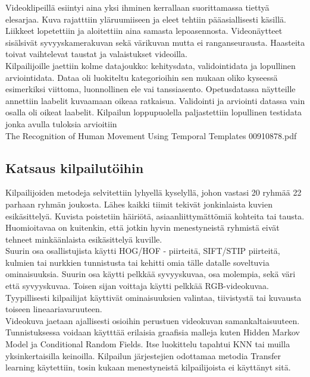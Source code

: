 Videoklipeillä esiintyi aina yksi ihminen kerrallaan suorittamassa tiettyä elesarjaa. Kuva rajatttiin yläruumiiseen ja eleet tehtiin
pääasiallisesti käsillä. Liikkeet lopetettiin ja aloitettiin aina samasta lepoasennosta. Videonäytteet sisälsivät syvyyskamerakuvan sekä värikuvan 
mutta ei ranganseurausta. Haasteita toivat vaihtelevat taustat ja valaistukset videoilla.\\

Kilpailijoille jaettiin kolme datajoukko: kehitysdata, validointidata ja lopullinen arviointidata. Dataa oli luokiteltu kategorioihin sen mukaan
oliko kyseessä esimerkiksi viittoma, luonnollinen ele vai tanssiasento. Opetusdatassa näytteille annettiin laabelit kuvaamaan oikeaa ratkaisua.
Validointi ja arviointi datassa vain osalla oli oikeat laabelit. Kilpailun loppupuolella paljastettiin lopullinen testidata jonka avulla tuloksia arvioitiin\\

The Recognition of Human Movement Using Temporal Templates
00910878.pdf


\subsection{Katsaus kilpailutöihin}
Kilpailijoiden metodeja selvitettiin lyhyellä kyselyllä, johon vastasi 20 ryhmää 22 parhaan ryhmän joukosta.
Lähes kaikki tiimit tekivät jonkinlaista kuvien esikäsittelyä. Kuvista poistetiin häiriötä, asiaanliittymättömiä kohteita tai tausta.
Huomioitavaa on kuitenkin, että jotkin hyvin menestyneistä ryhmistä eivät tehneet minkäänlaista esikäsittelyä kuville.\\

Suurin osa osallistujista käytti HOG/HOF - piirteitä, SIFT/STIP piirteitä, kulmien tai nurkkien tunnistusta tai kehitti omia tälle datalle soveltuvia ominaisuuksia.
Suurin osa käytti pelkkää syvyyskuvaa, osa molempia, sekä väri että syvyyskuvaa. Toisen sijan voittaja käytti pelkkää RGB-videokuvaa. 
Tyypillisesti kilpailijat käyttivät ominaisuuksien valintaa, tiivistystä tai kuvausta toiseen lineaariavaruuteen.\\

Videokuva jaetaan ajallisesti osioihin perustuen videokuvan samankaltaisuuteen. Tunnistuksessa voidaan käytttää erilaisia graafisia malleja
kuten Hidden Markov Model ja Conditional Random Fields. Itse luokittelu tapahtui KNN tai muilla yksinkertaisilla keinoilla. 
Kilpailun järjestejien odottamaa metodia Transfer learning käytettiin, tosin kukaan menestyneistä kilpailijoista ei käyttänyt sitä.\\


